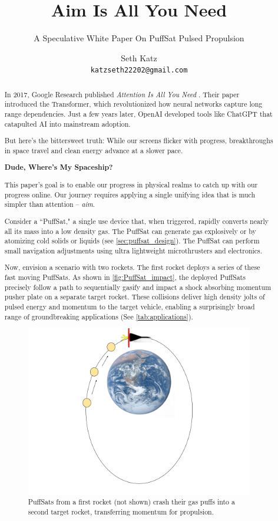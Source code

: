 \documentclass{article}
\title{Aim Is All You Need}
\subtitle{A Speculative White Paper On PuffSat Pulsed Propulsion}
\author{
  Seth Katz \\
  \texttt{katzseth22202@gmail.com} \\
}
\begin{document}
\maketitle

\newpage
\tableofcontents
\newpage

\begin{abstract}\label{sec:abstract}
 
In 2017, Google Research published \textit{Attention Is All You Need} \cite{vaswani2023attentionneed}.  Their paper introduced the Transformer, which revolutionized how neural networks capture long range dependencies.   Just a few years later, OpenAI developed tools like ChatGPT \cite{chatgpt} that catapulted AI into mainstream adoption.

But here's the bittersweet truth:  While our screens flicker with progress, breakthroughs in space travel and clean energy advance at a slower pace.

\textbf{Dude, Where's My Spaceship?}

This paper's goal is to enable our progress in physical realms to catch up with our progress online.  Our journey requires applying a single unifying idea that is much simpler than attention -- \textit{aim}.   

Consider a “PuffSat," a single use device that, when triggered, rapidly converts nearly all its mass into a low density gas.  The PuffSat can generate gas explosively or by atomizing cold solids or liquids (see \autoref{sec:puffsat_design}).  The PuffSat can perform small navigation adjustments using ultra lightweight microthrusters and electronics.

Now, envision a scenario with two rockets. The first rocket deploys a series of these fast moving PuffSats. As shown in \autoref{fig:PuffSat_impact}, the deployed PuffSats precisely follow a path to sequentially gasify and impact a shock absorbing momentum pusher plate on a separate target rocket. These collisions deliver high density jolts of pulsed energy and momentum to the target vehicle, enabling a surprisingly broad range of groundbreaking applications (See \autoref{tab:applications}). 

\begin{figure}[htpb]
    \centering
    \includegraphics[width=0.5\linewidth]{images/Starship_Impact_ellipse.png}
    \caption{PuffSats from a first rocket (not shown) crash their gas puffs into a second target rocket, transferring momentum for propulsion. \cite{earth_image}}
    \label{fig:PuffSat_impact}
\end{figure}


\end{abstract}
\end{document}
